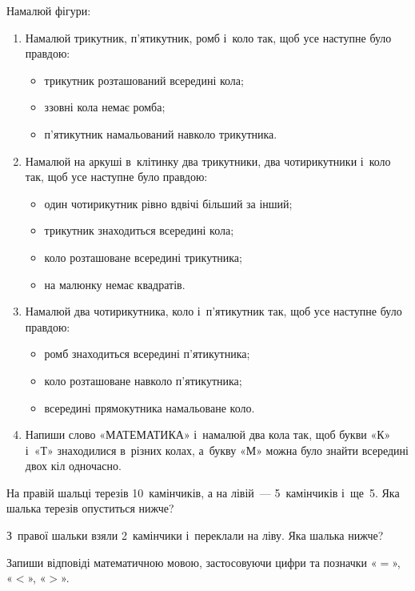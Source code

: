\problem
Намалюй фігури:
\begin{enumerate}
    \item Намалюй трикутник, п'ятикутник, ромб і~коло так,
    щоб усе наступне було правдою:
    \begin{itemize}
        \item трикутник розташований всередині кола;
        \item ззовні кола немає ромба;
        \item п'ятикутник намальований навколо трикутника.
    \end{itemize}
    \item Намалюй на аркуші в~клітинку два трикутники,
    два чотирикутники і~коло так, щоб усе наступне було правдою:
    \begin{itemize}
        \item один чотирикутник рівно вдвічі більший за інший;
        \item трикутник знаходиться всередині кола;
        \item коло розташоване всередині трикутника;
        \item на малюнку немає квадратів.
    \end{itemize}
    \item Намалюй два чотирикутника, коло і~п'ятикутник так,
    щоб усе наступне було правдою:
    \begin{itemize}
        \item ромб знаходиться всередині п'ятикутника;
        \item коло розташоване навколо п'ятикутника;
        \item всередині прямокутника намальоване коло.
    \end{itemize}
    \item Напиши слово «МАТЕМАТИКА» і~намалюй два кола так,
    щоб букви «К» і~«Т» знаходилися в~різних колах,
    а~букву «М» можна було знайти всередині двох кіл одночасно.
\end{enumerate}


\problem
На правій шальці терезів 10~камінчиків, а на лівій~--- 5~камінчиків і~ще~5.
Яка шалька терезів опуститься нижче?

З~правої шальки взяли 2~камінчики і~переклали на ліву.
Яка шалька нижче?

Запиши відповіді математичною мовою, застосовуючи цифри
та позначки «$=$», «$<$», «$>$».


